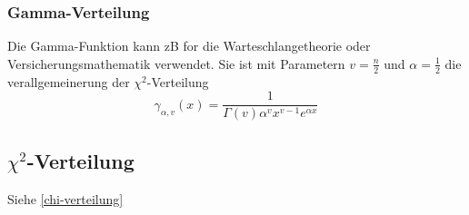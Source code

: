 \subsubsection{Gamma-Verteilung}
Die Gamma-Funktion kann zB for die Warteschlangetheorie oder Versicherungsmathematik verwendet. Sie ist mit Parametern $v=\frac{n}{2}$ und $\alpha=\frac{1}{2}$ die verallgemeinerung der $\chi^2$-Verteilung 
\[
\gamma_{\alpha,v}(x) = \frac{1}{\Gamma(v)\alpha^vx^{v-1}e^{\alpha x}}
\]

\subsection{$\chi^2$-Verteilung}
Siehe \ref{chi-verteilung}